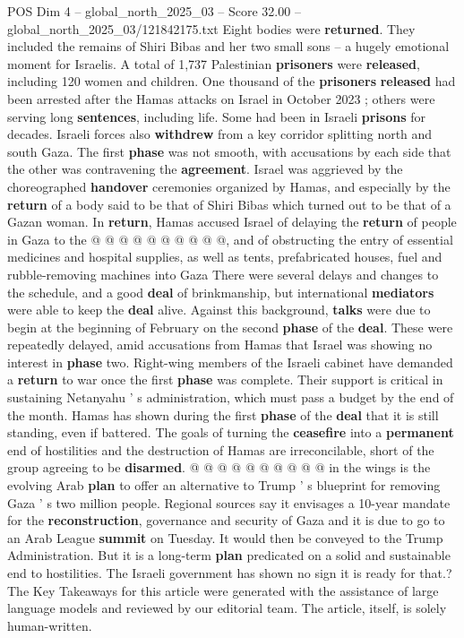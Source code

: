 \begin{textsample}{POS Dim 4 – global\_north\_2025\_03 – Score 32.00 – global\_north\_2025\_03/121842175.txt}
Eight bodies were \textbf{returned}.
They included the remains of Shiri Bibas and her two small sons -- a hugely emotional moment for Israelis.
A total of 1,737 Palestinian \textbf{prisoners} were \textbf{released}, including 120 women and children.
One thousand of the \textbf{prisoners} \textbf{released} had been arrested after the Hamas attacks on Israel in October 2023 ; others were serving long \textbf{sentences}, including life.
Some had been in Israeli \textbf{prisons} for decades.
Israeli forces also \textbf{withdrew} from a key corridor splitting north and south Gaza.
The first \textbf{phase} was not smooth, with accusations by each side that the other was contravening the \textbf{agreement}.
Israel was aggrieved by the choreographed \textbf{handover} ceremonies organized by Hamas, and especially by the \textbf{return} of a body said to be that of Shiri Bibas which turned out to be that of a Gazan woman.
In \textbf{return}, Hamas accused Israel of delaying the \textbf{return} of people in Gaza to the @ @ @ @ @ @ @ @ @ @, and of obstructing the entry of essential medicines and hospital supplies, as well as tents, prefabricated houses, fuel and rubble-removing machines into Gaza There were several delays and changes to the schedule, and a good \textbf{deal} of brinkmanship, but international \textbf{mediators} were able to keep the \textbf{deal} alive.
Against this background, \textbf{talks} were due to begin at the beginning of February on the second \textbf{phase} of the \textbf{deal}.
These were repeatedly delayed, amid accusations from Hamas that Israel was showing no interest in \textbf{phase} two.
Right-wing members of the Israeli cabinet have demanded a \textbf{return} to war once the first \textbf{phase} was complete.
Their support is critical in sustaining Netanyahu ' s administration, which must pass a budget by the end of the month.
Hamas has shown during the first \textbf{phase} of the \textbf{deal} that it is still standing, even if battered.
The goals of turning the \textbf{ceasefire} into a \textbf{permanent} end of hostilities and the destruction of Hamas are irreconcilable, short of the group agreeing to be \textbf{disarmed}. @ @ @ @ @ @ @ @ @ @ in the wings is the evolving Arab \textbf{plan} to offer an alternative to Trump ' s blueprint for removing Gaza ' s two million people.
Regional sources say it envisages a 10-year mandate for the \textbf{reconstruction}, governance and security of Gaza and it is due to go to an Arab League \textbf{summit} on Tuesday.
It would then be conveyed to the Trump Administration.
But it is a long-term \textbf{plan} predicated on a solid and sustainable end to hostilities.
The Israeli government has shown no sign it is ready for that.?
The Key Takeaways for this article were generated with the assistance of large language models and reviewed by our editorial team.
The article, itself, is solely human-written.


\end{textsample}
